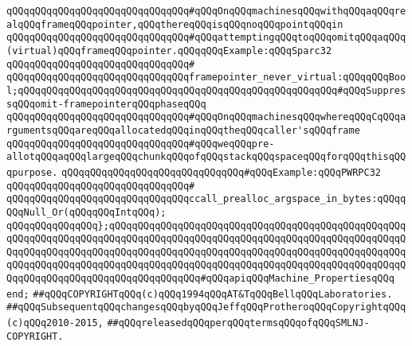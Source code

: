 \newline
\verb|qQQqqQQqqQQqqQQqqQQqqQQqqQQqqQQq#qQQqOnqQQqmachinesqQQqwithqQQqaqQQqrealqQQqframeqQQqpointer,qQQqthereqQQqisqQQqnoqQQqpointqQQqin|\newline
\verb|qQQqqQQqqQQqqQQqqQQqqQQqqQQqqQQq#qQQqattemptingqQQqtoqQQqomitqQQqaqQQq(virtual)qQQqframeqQQqpointer.qQQqqQQqExample:qQQqSparc32|\newline
\verb|qQQqqQQqqQQqqQQqqQQqqQQqqQQqqQQq#|\newline
\verb|qQQqqQQqqQQqqQQqqQQqqQQqqQQqqQQqframepointer_never_virtual:qQQqqQQqBool;qQQqqQQqqQQqqQQqqQQqqQQqqQQqqQQqqQQqqQQqqQQqqQQqqQQqqQQq#qQQqSuppressqQQqomit-framepointerqQQqphaseqQQq|\newline
\newline
\verb|qQQqqQQqqQQqqQQqqQQqqQQqqQQqqQQq#qQQqOnqQQqmachinesqQQqwhereqQQqCqQQqargumentsqQQqareqQQqallocatedqQQqinqQQqtheqQQqcaller'sqQQqframe|\newline
\verb|qQQqqQQqqQQqqQQqqQQqqQQqqQQqqQQq#qQQqweqQQqpre-allotqQQqaqQQqlargeqQQqchunkqQQqofqQQqstackqQQqspaceqQQqforqQQqthisqQQqpurpose.|\newline
\verb|qQQqqQQqqQQqqQQqqQQqqQQqqQQqqQQq#qQQqExample:qQQqPWRPC32|\newline
\verb|qQQqqQQqqQQqqQQqqQQqqQQqqQQqqQQq#|\newline
\verb|qQQqqQQqqQQqqQQqqQQqqQQqqQQqqQQqccall_prealloc_argspace_in_bytes:qQQqqQQqNull_Or(qQQqqQQqIntqQQq);|\newline
\verb|qQQqqQQqqQQqqQQq};qQQqqQQqqQQqqQQqqQQqqQQqqQQqqQQqqQQqqQQqqQQqqQQqqQQqqQQqqQQqqQQqqQQqqQQqqQQqqQQqqQQqqQQqqQQqqQQqqQQqqQQqqQQqqQQqqQQqqQQqqQQqqQQqqQQqqQQqqQQqqQQqqQQqqQQqqQQqqQQqqQQqqQQqqQQqqQQqqQQqqQQqqQQqqQQqqQQqqQQqqQQqqQQqqQQqqQQqqQQqqQQqqQQqqQQqqQQqqQQqqQQqqQQqqQQqqQQqqQQqqQQqqQQqqQQqqQQqqQQqqQQqqQQqqQQqqQQq#qQQqapiqQQqMachine_PropertiesqQQq|\newline
\verb|end;|\newline
\newline
\verb|##qQQqCOPYRIGHTqQQq(c)qQQq1994qQQqAT&TqQQqBellqQQqLaboratories.|\newline
\verb|##qQQqSubsequentqQQqchangesqQQqbyqQQqJeffqQQqProtheroqQQqCopyrightqQQq(c)qQQq2010-2015,|\newline
\verb|##qQQqreleasedqQQqperqQQqtermsqQQqofqQQqSMLNJ-COPYRIGHT.|\newline

